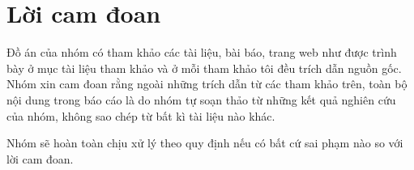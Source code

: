 \section*{Lời cam đoan}
\thispagestyle{empty}

Đồ án của nhóm có tham khảo các tài liệu, bài báo, trang web như được trình bày ở mục tài liệu tham khảo và ở mỗi tham khảo tôi đều trích dẫn nguồn gốc. Nhóm xin cam đoan rằng ngoài những trích dẫn từ các tham khảo trên, toàn bộ nội dung trong báo cáo là do nhóm tự soạn thảo từ những kết quả nghiên cứu của nhóm, không sao chép từ bất kì tài liệu nào khác.

Nhóm sẽ hoàn toàn chịu xử lý theo quy định nếu có bất cứ sai phạm nào so với
lời cam đoan.

\clearpage
{}
